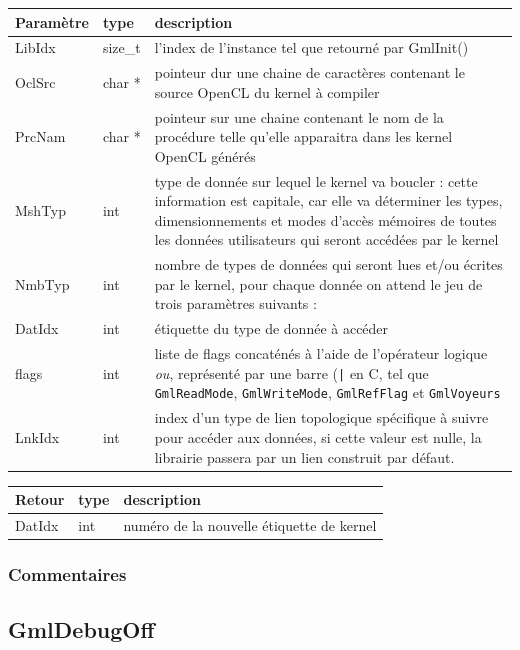 \documentclass[a4paper,12pt]{article}
\begin{document}
\begin{tabular}{|m{2cm}|m{1.5cm}|m{10.5cm}|}
\hline
Paramètre  & type    & description \\
\hline
LibIdx     & size\_t & l'index de l'instance tel que retourné par GmlInit() \\
\hline
OclSrc     & char *  & pointeur dur une chaine de caractères contenant le source OpenCL du kernel à compiler \\
\hline
PrcNam     & char *  & pointeur sur une chaine contenant le nom de la procédure telle qu'elle apparaitra dans les kernel OpenCL générés \\
\hline
MshTyp     & int     & type de donnée sur lequel le kernel va boucler : cette information est capitale, car elle va déterminer les types, dimensionnements et modes d'accès mémoires de toutes les données utilisateurs qui seront accédées par le kernel \\
\hline
NmbTyp     & int     & nombre de types de données qui seront lues et/ou écrites par le kernel, pour chaque donnée on attend le jeu de trois paramètres suivants : \\
\hline
DatIdx     & int     & étiquette du type de donnée à accéder \\
\hline
flags      & int     & liste de flags concaténés à l'aide de l'opérateur logique \emph{ou}, représenté par une barre ({\tt |} en C, tel que {\tt GmlReadMode}, {\tt GmlWriteMode}, {\tt GmlRefFlag} et {\tt GmlVoyeurs} \\
\hline
LnkIdx     & int     & index d'un type de lien topologique spécifique à suivre pour accéder aux données, si cette valeur est nulle, la librairie passera par un lien construit par défaut. \\
\hline
\end{tabular}

\medskip


\begin{tabular}{|m{2cm}|m{1.5cm}|m{10.5cm}|}
\hline
Retour     & type   & description \\
\hline
DatIdx     & int    & numéro de la nouvelle étiquette de kernel\\
\hline
\end{tabular}

\subsubsection*{Commentaires}


\subsection{GmlDebugOff}
\end{document}
